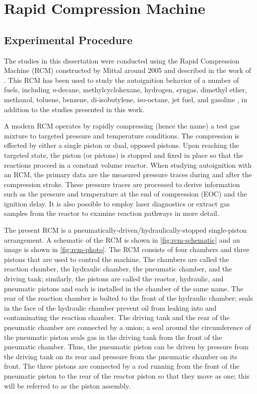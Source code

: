 \documentclass[../main.tex]{subfiles}
\begin{document}
\section{Rapid Compression Machine}
\label{sec:rcm}
\subsection{Experimental Procedure}
The studies in this dissertation were conducted using the Rapid
Compression Machine (RCM) constructed by Mittal around 2005 and described in the
work of \textcite{Mittal2007,Mittal2006a}. This RCM has been used to
study the autoignition behavior of a number of fuels, including
\textit{n}-decane, methylcyclohexane, hydrogen, syngas,
dimethyl ether, methanol, toluene, benzene, di-isobutylene, iso-octane,
jet fuel, and gasoline \cite{Kumar2009, Mittal2009, Das2012a, Mittal2006,
Das2012, Mittal2008a, Kumar2011a, Mittal2007a, Mittal2008, Kumar2010,
Dooley2010, Dooley2012, Hui2012a, Keromnes2013, Kukkadapu2013, Kukkadapu2012a},
in addition to the studies presented in this work.

A modern RCM operates by rapidly compressing (hence the name) a test gas
mixture to targeted pressure and temperature conditions. The compression
is effected by either a single piston or dual, opposed pistons. Upon
reaching the targeted state, the piston (or pistons) is stopped and
fixed in place so that the reactions proceed in a constant volume
reactor. When studying autoignition with an RCM, the primary data are
the measured pressure traces during and after the compression stroke.
These pressure traces are processed to derive information such as the
pressure and temperature at the end of compression (EOC) and the
ignition delay. It is also possible to employ laser diagnostics or
extract gas samples from the reactor to examine reaction pathways in
more detail.

The present RCM is a pneumatically-driven/hydraulically-stopped
single-piston arrangement. A schematic of the RCM is shown in
\cref{fig:rcm-schematic} and an image is shown in \cref{fig:rcm-photo}.
The RCM consists of four chambers and
three pistons that are used to control the machine. The chambers are
called the reaction chamber, the hydraulic chamber, the pneumatic
chamber, and the driving tank; similarly, the pistons are called
the reactor, hydraulic, and pneumatic pistons and each is installed
in the chamber of the same name. The rear of the reaction chamber
is bolted to the front of the hydraulic chamber; seals in the face
of the hydraulic chamber prevent oil from leaking into and contaminating
the reaction chamber. The driving tank and the rear of the pneumatic
chamber are connected by a union; a seal around the circumference of
the pneumatic piston seals gas in the driving tank from the front of
the pneumatic chamber. Thus, the pneumatic piston can be driven by
pressure from the driving tank on its rear and pressure from the
pneumatic chamber on its front. The three pistons are connected by
a rod running from the front of the pneumatic piston to the rear of
the reactor piston so that they move as one; this will be referred
to as the piston assembly.
\end{document}
